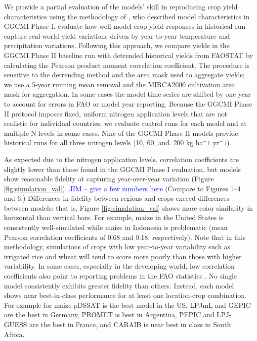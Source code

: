 \documentclass[gmd, manuscript]{copernicus} %
\begin{document}
We provide a partial evaluation of the models' skill in reproducing crop yield characteristics using the methodology of \citet{muller_global_2017}, who described model characteristics in GGCMI Phase I. 
\citet{muller_global_2017} evaluate how well model crop yield responses in historical run capture real-world yield variations driven by year-to-year temperature and precipitation variations. 
Following this approach, we compare yields in the GGCMI Phase II baseline run with detrended historical yields from FAOSTAT \citep{FAOSTAT} by calculating the Pearson product moment correlation coefficient. 
The procedure is sensitive to the detrending method and the area mask used to aggregate yields; we use a 5-year running mean removal and the MIRCA2000 cultivation area mask for aggregation. 
In some cases the model time series are shifted by one year to account for errors in FAO or model year reporting. 
Because the GGCMI Phase II protocol imposes fixed, uniform nitrogen application levels that are not realistic for individual countries, we evaluate control runs for each model and at multiple N levels in some cases. Nine of the GGCMI Phase II models provide historical runs for all three nitrogen levels (10, 60, and. 200 kg ha$^-1$ yr$^-1$). 


As expected due to the nitrogen application levels, correlation coefficients are slightly lower than those found in the GGCMI Phase I evaluation, but models show reasonable fidelity at capturing year-over-year variation (Figure \ref{fig:simulation_val}). 
\textcolor{blue}{JIM -- give a few numbers here}
(Compare to \citet{muller_global_2017} Figures 1--4 and 6.)  
Differences in fidelity between regions and crops exceed differences between models: 
that is, Figure \ref{fig:simulation_val} shows more color similarity in horizontal than vertical bars. 
For example, maize in the United States is consistently well-simulated while maize in Indonesia is problematic (mean Pearson correlation coefficients of 0.68 and 0.18, respectively). 
Note that in this methodology, simulations of crops with low year-to-year variability such as irrigated rice and wheat will tend to score more poorly than those with higher variability.
In some cases, especially in the developing world, low correlation coefficients also point to reporting problems in the FAO statistics \citep{Ray2012, muller_global_2017}. 
No single model consistently exhibits greater fidelity than others. 
Instead, each model shows near best-in-class performance for at least one location-crop combination. For example for maize pDSSAT is the best model in the US, LPJmL and GEPIC are the best in Germany, PROMET is best in Argentina, PEPIC and LPJ-GUESS are the best in France, and CARAIB is near best in class in South Africa. 
\end{document}
